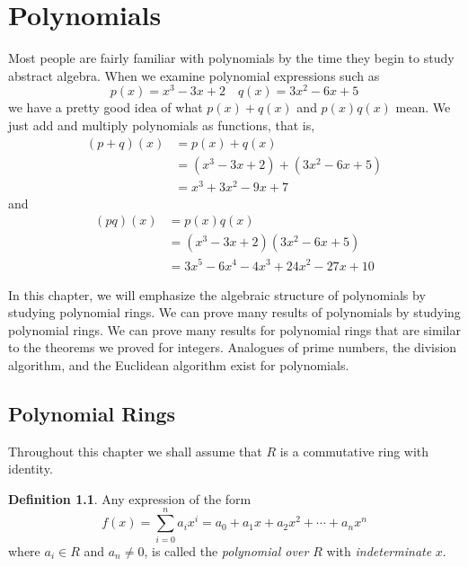 \documentclass[11pt]{book}
\theoremstyle{definition}\newtheorem{definition}[subsection]{Definition}
\theoremstyle{definition}\newtheorem{example}[subsection]{Example}
\theoremstyle{definition}\newtheorem{notation}[subsection]{Notation}
\theoremstyle{definition}\newtheorem{remark}[subsection]{Remark}
\theoremstyle{theorem}\newtheorem{theorem}[subsection]{Theorem}
\theoremstyle{theorem}\newtheorem{lemma}[subsection]{Lemma}
\theoremstyle{theorem}\newtheorem{proposition}[subsection]{Proposition}
\theoremstyle{theorem}\newtheorem{corollary}[subsection]{Corollary}
\begin{document}
\chapter{Polynomials}

Most people are fairly familiar with polynomials by the time they begin to study abstract algebra. When we examine polynomial expressions such as
\begin{equation*}
    p(x) = x^3 - 3x + 2 \quad q(x) = 3x^2 - 6x + 5
\end{equation*}
we have a pretty good idea of what $p(x) + q(x)$ and $p(x)q(x)$ mean. We just add and multiply polynomials as functions, that is,
\begin{align*}
    (p + q)(x) &= p(x) + q(x) \\
    &= (x^3 - 3x + 2) + (3x^2 - 6x + 5) \\
    &= x^3 + 3x^2 - 9x + 7
\end{align*}
and
\begin{align*}
    (pq)(x) &= p(x)q(x) \\
    &= (x^3 - 3x + 2)(3x^2 - 6x + 5) \\
    &= 3x^5- 6x^4 - 4x^3 + 24x^2 - 27x + 10
\end{align*}

In this chapter, we will emphasize the algebraic structure of polynomials by studying polynomial rings. We can prove many results of polynomials by studying polynomial rings. We can prove many results for polynomial rings that are similar to the theorems we proved for integers. Analogues of prime numbers, the division algorithm, and the Euclidean algorithm exist for polynomials.

\section{Polynomial Rings}

Throughout this chapter we shall assume that $R$ is a commutative ring with identity.

\begin{definition}\label{definition:2.1.1}
    Any expression of the form
    \begin{equation*}
        f(x) = \sum_{i = 0}^{n} a_ix^i = a_0 + a_1x + a_2x^2 + \cdots + a_nx^n
    \end{equation*}
    where $a_i \in R$ and $a_n \neq 0$, is called the \emph{polynomial over $R$} with \emph{indeterminate} $x$.
\end{definition}
\end{document}
